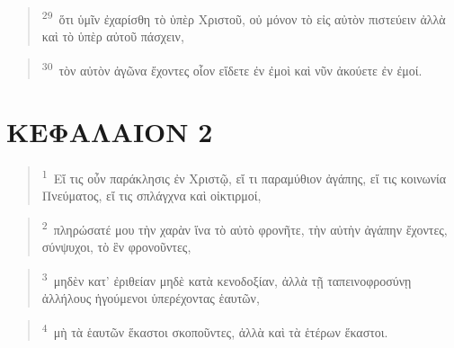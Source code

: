 \documentclass{article}
\newcommand{\currentverse}{1} %
\newcommand{\setcurrentverse}[1]{\renewcommand{\currentverse}{#1}}
\begin{document}
\begin{verse}

\setcurrentverse{29}

\setcounter{footnote}{0}

\textsuperscript{29}~ὅτι ὑμῖν ἐχαρίσθη τὸ ὑπὲρ Χριστοῦ, οὐ μόνον τὸ εἰς αὐτὸν πιστεύειν ἀλλὰ καὶ τὸ ὑπὲρ αὐτοῦ πάσχειν,

\end{verse}

\begin{verse}

\setcurrentverse{30}

\setcounter{footnote}{0}

\textsuperscript{30}~τὸν αὐτὸν ἀγῶνα ἔχοντες οἷον εἴδετε ἐν ἐμοὶ καὶ νῦν ἀκούετε ἐν ἐμοί.

\end{verse}

\section*{ΚΕΦΑΛΑΙΟΝ 2}

\begin{verse}

\setcurrentverse{1}

\setcounter{footnote}{0}

\textsuperscript{1}~Εἴ τις οὖν παράκλησις ἐν Χριστῷ, εἴ τι παραμύθιον ἀγάπης, εἴ τις κοινωνία Πνεύματος, εἴ τις σπλάγχνα καὶ οἰκτιρμοί,

\end{verse}

\begin{verse}

\setcurrentverse{2}

\setcounter{footnote}{0}

\textsuperscript{2}~πληρώσατέ μου τὴν χαρὰν ἵνα τὸ αὐτὸ φρονῆτε, τὴν αὐτὴν ἀγάπην ἔχοντες, σύνψυχοι, τὸ ἓν φρονοῦντες,

\end{verse}

\begin{verse}

\setcurrentverse{3}

\setcounter{footnote}{0}

\textsuperscript{3}~μηδὲν κατ’ ἐριθείαν μηδὲ κατὰ κενοδοξίαν, ἀλλὰ τῇ ταπεινοφροσύνῃ ἀλλήλους ἡγούμενοι ὑπερέχοντας ἑαυτῶν,

\end{verse}

\begin{verse}

\setcurrentverse{4}

\setcounter{footnote}{0}

\textsuperscript{4}~μὴ τὰ ἑαυτῶν ἕκαστοι σκοποῦντες, ἀλλὰ καὶ τὰ ἑτέρων ἕκαστοι.

\end{verse}
\end{document}
